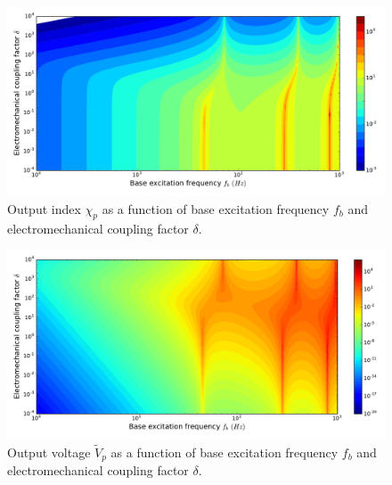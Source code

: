 \documentclass{article}
\begin{document}
\begin{figure}[!htbp]
    \centering
    \includegraphics[width=\textwidth]{./img_eig_asy/fig_sol_analytic_out_index_contour}
    \caption{Output index $\chi_p$ as a function of base excitation frequency $f_b$ and electromechanical coupling factor $\delta$.}
    \label{fig:fig_sol_analytic_out_index_contour}
\end{figure}



\begin{figure}[!htbp]
    \centering
    \includegraphics[width=\textwidth]{./img_eig_asy/fig_sol_analytic_out_vol_contour}
    \caption{Output voltage $\tilde{V}_p$ as a function of base excitation frequency $f_b$ and electromechanical coupling factor $\delta$.}
    \label{fig:fig_sol_analytic_out_vol_contour}
\end{figure}
\end{document}

